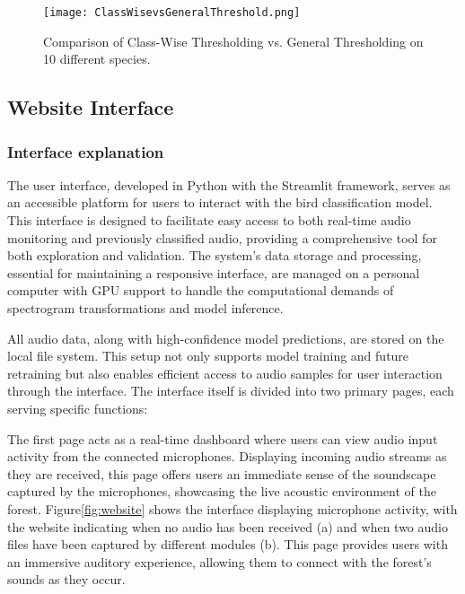 \begin{figure}[h]
    \centering
    \texttt{[image: ClassWisevsGeneralThreshold.png]}
    \caption{Comparison of Class-Wise Thresholding vs. General Thresholding on 10 different species.}
    \vspace{0.1cm}
    \label{fig:vsclass}
\end{figure}

\subsection{Website Interface}
\subsubsection{Interface explanation}

The user interface, developed in Python with the Streamlit framework, serves as an accessible platform for users to interact with the bird classification model. This interface is designed to facilitate easy access to both real-time audio monitoring and previously classified audio, providing a comprehensive tool for both exploration and validation. The system’s data storage and processing, essential for maintaining a responsive interface, are managed on a personal computer with GPU support to handle the computational demands of spectrogram transformations and model inference.

All audio data, along with high-confidence model predictions, are stored on the local file system. This setup not only supports model training and future retraining but also enables efficient access to audio samples for user interaction through the interface. The interface itself is divided into two primary pages, each serving specific functions:

The first page acts as a real-time dashboard where users can view audio input activity from the connected microphones. Displaying incoming audio streams as they are received, this page offers users an immediate sense of the soundscape captured by the microphones, showcasing the live acoustic environment of the forest. Figure\ref{fig:website} shows the interface displaying microphone activity, with the website indicating when no audio has been received (a) and when two audio files have been captured by different modules (b). This page provides users with an immersive auditory experience, allowing them to connect with the forest’s sounds as they occur.

